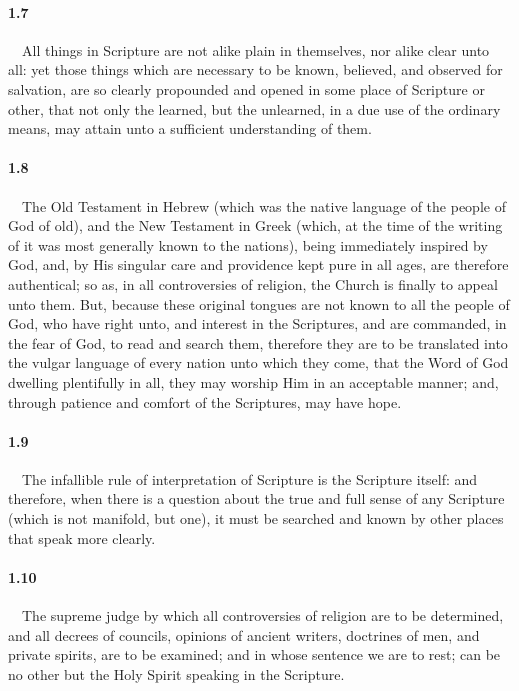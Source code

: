 \paragraph{1.7}\ \ All things in Scripture are not alike plain in themselves, nor alike clear unto all: yet those things which are necessary to be known, believed, and observed for salvation, are so clearly propounded and opened in some place of Scripture or other, that not only the learned, but the unlearned, in a due use of the ordinary means, may attain unto a sufficient understanding of them.   
\bigskip
\paragraph{1.8}\ \ The Old Testament in Hebrew (which was the native language of the people of God of old), and the New Testament in Greek (which, at the time of the writing of it was most generally known to the nations), being immediately inspired by God, and, by His singular care and providence kept pure in all ages, are therefore authentical; so as, in all controversies of religion, the Church is finally to appeal unto them. But, because these original tongues are not known to all the people of God, who have right unto, and interest in the Scriptures, and are commanded, in the fear of God, to read and search them, therefore they are to be translated into the vulgar language of every nation unto which they come, that the Word of God dwelling plentifully in all, they may worship Him in an acceptable manner; and, through patience and comfort of the Scriptures, may have hope.   
\bigskip
\paragraph{1.9}\ \ The infallible rule of interpretation of Scripture is the Scripture itself: and therefore, when there is a question about the true and full sense of any Scripture (which is not manifold, but one), it must be searched and known by other places that speak more clearly.   
\bigskip
\paragraph{1.10}\ \ The supreme judge by which all controversies of religion are to be determined, and all decrees of councils, opinions of ancient writers, doctrines of men, and private spirits, are to be examined; and in whose sentence we are to rest; can be no other but the Holy Spirit speaking in the Scripture.  

